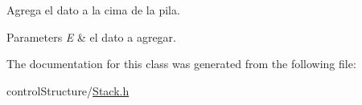 Agrega el dato a la cima de la pila. 


\begin{DoxyParams}{Parameters}
{\em E} & el dato a agregar. \\
\hline
\end{DoxyParams}


The documentation for this class was generated from the following file\-:\begin{DoxyCompactItemize}
\item 
control\-Structure/\hyperlink{_stack_8h}{Stack.\-h}\end{DoxyCompactItemize}
